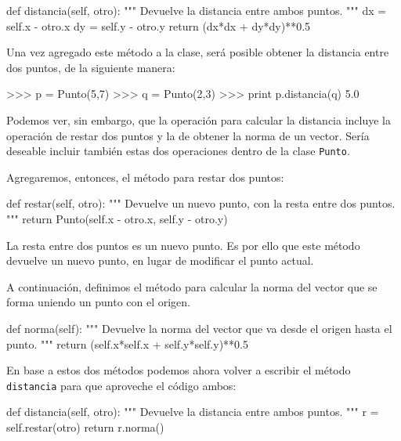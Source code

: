 \begin{codigo-python-sn}
    def distancia(self, otro):
        """ Devuelve la distancia entre ambos puntos. """
        dx = self.x - otro.x
        dy = self.y - otro.y
        return (dx*dx + dy*dy)**0.5
\end{codigo-python-sn}

Una vez agregado este método a la clase, será posible obtener la distancia
entre dos puntos, de la siguiente manera:

\begin{codigo-python-sn}
>>> p = Punto(5,7)
>>> q = Punto(2,3)
>>> print p.distancia(q)
5.0
\end{codigo-python-sn}

Podemos ver, sin embargo, que la operación para calcular la distancia
incluye la operación de restar dos puntos y la de obtener la norma de un
vector. Sería deseable incluir también estas dos operaciones dentro de la
clase \lstinline!Punto!.

Agregaremos, entonces, el método para restar dos puntos:

\begin{codigo-python-sn}
    def restar(self, otro):
        """ Devuelve un nuevo punto, con la resta entre dos puntos. """
        return Punto(self.x - otro.x, self.y - otro.y)
\end{codigo-python-sn}

La resta entre dos puntos es un nuevo punto.  Es por ello que este método
devuelve un nuevo punto, en lugar de modificar el punto actual.

A continuación, definimos el método para calcular la norma del vector que
se forma uniendo un punto con el origen.

\begin{codigo-python-sn}
    def norma(self):
        """ Devuelve la norma del vector que va desde el origen
            hasta el punto. """
        return (self.x*self.x + self.y*self.y)**0.5
\end{codigo-python-sn}

En base a estos dos métodos podemos ahora volver a escribir el método
\lstinline!distancia! para que aproveche el código ambos:

\begin{codigo-python-sn}
    def distancia(self, otro):
        """ Devuelve la distancia entre ambos puntos. """
        r = self.restar(otro)
        return r.norma()
\end{codigo-python-sn}

